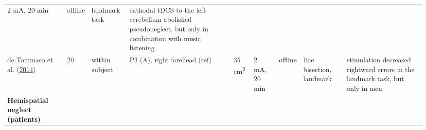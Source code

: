 \documentclass[11pt,]{memoir}
\begin{document}
\begin{longtable}[]{@{}lllllllll@{}}
\begin{minipage}[t]{0.05\columnwidth}
2 mA, 20
min\strut
\end{minipage} & \begin{minipage}[t]{0.04\columnwidth}\raggedright
offline\strut
\end{minipage} & \begin{minipage}[t]{0.15\columnwidth}\raggedright
landmark task\strut
\end{minipage} & \begin{minipage}[t]{0.24\columnwidth}\raggedright
cathodal tDCS to the left cerebellum abolished
pseudoneglect, but only in combination with music listening\strut
\end{minipage}\tabularnewline
\begin{minipage}[t]{0.09\columnwidth}\raggedright
de Tommaso et al. (\protect\hyperlink{ref-DeTommaso2014}{2014})\strut
\end{minipage} & \begin{minipage}[t]{0.02\columnwidth}\raggedright
20\strut
\end{minipage} & \begin{minipage}[t]{0.04\columnwidth}\raggedright
within
subject\strut
\end{minipage} & \begin{minipage}[t]{0.10\columnwidth}\raggedright
P3 (A), right forehead
(ref)\strut
\end{minipage} & \begin{minipage}[t]{0.03\columnwidth}\raggedright
35
cm\textsuperscript{2}\strut
\end{minipage} & \begin{minipage}[t]{0.05\columnwidth}\raggedright
2 mA, 20
min\strut
\end{minipage} & \begin{minipage}[t]{0.04\columnwidth}\raggedright
offline\strut
\end{minipage} & \begin{minipage}[t]{0.15\columnwidth}\raggedright
line bisection, landmark\strut
\end{minipage} & \begin{minipage}[t]{0.24\columnwidth}\raggedright
stimulation decreased rightward errors in the landmark task,
but only in men\strut
\end{minipage}\tabularnewline
\begin{minipage}[t]{0.09\columnwidth}\raggedright
\textbf{Hemispatial
neglect (patients)}\strut
\end{minipage} & \begin{minipage}[t]{0.02\columnwidth}\raggedright

\end{minipage}
\end{longtable}
\end{document}

